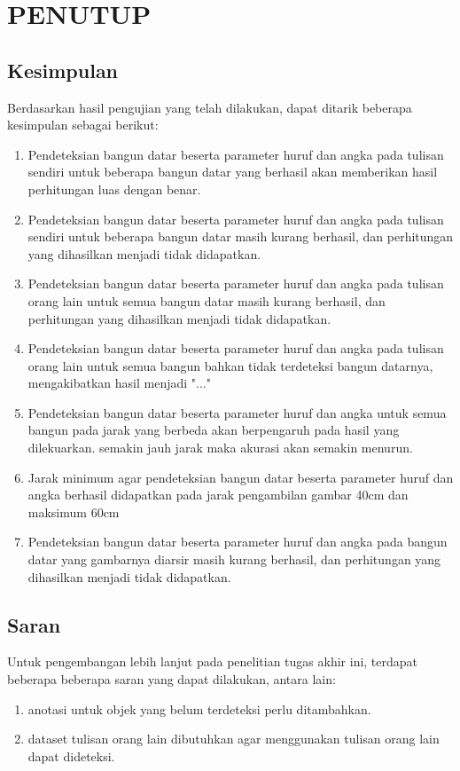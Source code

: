 \chapter{PENUTUP}
\label{chap:penutup}
\section{Kesimpulan}
\label{sec:kesimpulan}
Berdasarkan hasil pengujian yang telah dilakukan, dapat ditarik beberapa kesimpulan sebagai berikut:
\begin{enumerate}
	\item Pendeteksian bangun datar beserta parameter huruf dan angka pada tulisan sendiri untuk beberapa bangun datar yang berhasil akan memberikan hasil perhitungan luas dengan benar.
	\item Pendeteksian bangun datar beserta parameter huruf dan angka pada tulisan sendiri untuk beberapa bangun datar masih kurang berhasil, dan perhitungan yang dihasilkan menjadi tidak didapatkan.
	\item Pendeteksian bangun datar beserta parameter huruf dan angka pada tulisan orang lain untuk semua bangun datar masih kurang berhasil, dan perhitungan yang dihasilkan menjadi tidak didapatkan.
	\item Pendeteksian bangun datar beserta parameter huruf dan angka pada tulisan orang lain untuk semua bangun bahkan tidak terdeteksi bangun datarnya, mengakibatkan hasil menjadi "..."
	\item Pendeteksian bangun datar beserta parameter huruf dan angka untuk semua bangun pada jarak yang berbeda akan berpengaruh pada hasil yang dilekuarkan. semakin jauh jarak maka akurasi akan semakin menurun.
	\item Jarak minimum agar pendeteksian bangun datar beserta parameter huruf dan angka berhasil didapatkan pada jarak pengambilan gambar 40cm dan maksimum 60cm
	\item Pendeteksian bangun datar beserta parameter huruf dan angka pada bangun datar yang gambarnya diarsir masih kurang berhasil, dan perhitungan yang dihasilkan menjadi tidak didapatkan.
\end{enumerate}

\section{Saran}
Untuk pengembangan lebih lanjut pada penelitian tugas akhir
ini, terdapat beberapa beberapa saran yang dapat dilakukan, antara lain:
\begin{enumerate}
	\item anotasi untuk objek yang belum terdeteksi perlu ditambahkan.
	\item dataset tulisan orang lain dibutuhkan agar menggunakan tulisan orang lain dapat dideteksi.
\end{enumerate}



